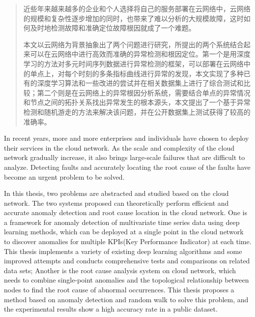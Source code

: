 

\begin{abstract}
  近些年来越来越多的企业和个人选择将自己的服务部署在云网络中，云网络的规模和复杂性逐步增加的同时，也带来了难以分析的大规模故障，这时如何及时地检测故障和准确定位故障根因就成了一个难题。

  本文以云网络为背景抽象出了两个问题进行研究，所提出的两个系统结合起来可以在云网络中进行高效而准确的异常检测和根因定位。第一个是用深度学习的方法对多元时间序列数据进行异常检测的框架，可以部署在云网络中的单点上，对每个时刻的多条指标曲线进行异常的发现，本文实现了多种已有的深度学习算法和一些改进的尝试并在相关数据集上进行了综合测试和比较；第二个则是在云网络上的异常根因分析系统，需要结合单点的异常情况和节点之间的拓扑关系找出异常发生的根本源头，本文提出了一个基于异常检测和随机游走的方法来解决该问题，并在公开数据集上测试获得了较高的准确率。

\end{abstract}

\begin{abstract*}
  In recent years, more and more enterprises and individuals have chosen to deploy their services in the cloud network. As the scale and complexity of the cloud network gradually increase, it also brings large-scale failures that are difficult to analyze. Detecting faults and accurately locating the root cause of the faults have become an urgent problem to be solved.

  In this thesis, two problems are abstracted and studied based on the cloud network. The two systems proposed can theoretically perform efficient and accurate anomaly detection and root cause location in the cloud network. One is a framework for anomaly detection of multivariate time series data using deep learning methods, which can be deployed at a single point in the cloud network to discover anomalies for multiple KPIs(Key Performance Indicator) at each time. This thesis implements a variety of existing deep learning algorithms and some improved attempts and conducts comprehensive tests and comparisons on related data sets; Another is the root cause analysis system on cloud network, which needs to combine single-point anomalies and the topological relationship between nodes to find the root cause of abnormal occurrences. This thesis proposes a method based on anomaly detection and random walk to solve this problem, and the experimental results show a high accuracy rate in a public dataset.

\end{abstract*}
